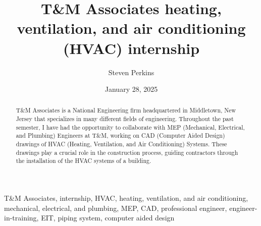 ﻿\documentclass[12pt,conference,onecolumn]{IEEEtran}
\title{T\&M Associates heating, ventilation, and air conditioning (HVAC) internship}
\author{Steven Perkins}
\date{January 28, 2025}
\begin{document}
\maketitle 

\begin{abstract}
T\&M Associates is a National Engineering firm headquartered in Middletown, New Jersey that specializes in many different fields of engineering. Throughout the past semester, I have had the opportunity to collaborate with MEP (Mechanical, Electrical, and Plumbing) Engineers at T\&M, working on CAD (Computer Aided Design) drawings of HVAC (Heating, Ventilation, and Air Conditioning) Systems. These drawings play a crucial role in the construction process, guiding contractors through the installation of the HVAC systems of a building.
\end{abstract}

\begin{IEEEkeywords}
T\&M Associates, internship, HVAC, heating, ventilation, and air conditioning, mechanical, electrical, and plumbing, MEP, CAD, professional engineer, engineer-in-training, EIT, piping system, computer aided design
\end{IEEEkeywords}
\end{document}
